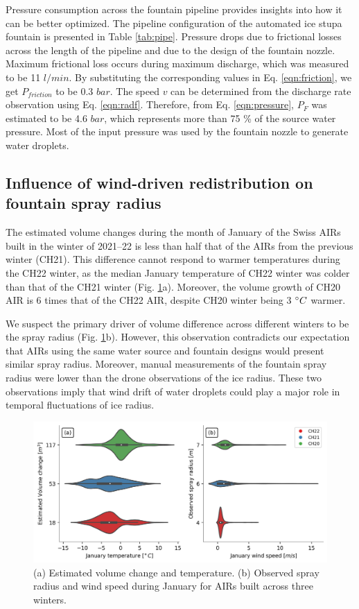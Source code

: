 \documentclass[tc, manuscript]{copernicus}
\begin{document}
Pressure consumption across the fountain pipeline provides insights into how it can be better optimized. The
pipeline configuration of the automated ice stupa fountain is presented in Table \ref{tab:pipe}. Pressure drops
due to frictional losses across the length of the pipeline and due to the design of the fountain nozzle. Maximum
frictional loss occurs during maximum discharge, which was measured to be 11 $l/min$. By substituting the
corresponding values in Eq. \ref{eqn:friction}, we get $P_{friction}$ to be 0.3 $bar$. The speed $v$ can be
determined from the discharge rate observation using Eq. \ref{eqn:radf}. Therefore, from Eq. \ref{eqn:pressure},
$P_{F}$ was estimated to be 4.6 $bar$, which represents more than 75 \% of the source water pressure. Most
of the input pressure was used by the fountain nozzle to generate water droplets.


\subsection{Influence of wind-driven redistribution on fountain spray radius}

The estimated volume changes during the month of January of the Swiss AIRs built in the winter of 2021--22 is less
than half that of the AIRs from the previous winter (CH21). This difference cannot respond to warmer
temperatures during the CH22 winter, as the median January temperature of CH22 winter was colder than that of the
CH21 winter (Fig. \ref{fig:CH_diffs}a). Moreover, the volume growth of CH20 AIR is 6 times that of the CH22 AIR,
despite CH20 winter being 3 $^{\circ} C$ warmer.

We suspect the primary driver of volume difference across different winters to be the spray radius (Fig.
\ref{fig:CH_diffs}b). However, this observation contradicts our expectation that AIRs using the same water
source and fountain designs would present similar spray radius. Moreover, manual measurements of the fountain
spray radius were lower than the drone observations of the ice radius. These two observations imply that wind
drift of water droplets could play a major role in temporal fluctuations of ice radius.

\begin{figure}[htb]
\includegraphics[width=\textwidth]{Figures/CH_diffs.jpg}

\caption{(a) Estimated volume change and temperature. (b) Observed spray radius and wind speed
during January for AIRs built across three winters. } 

\label{fig:CH_diffs} 
\end{figure}
\end{document}
